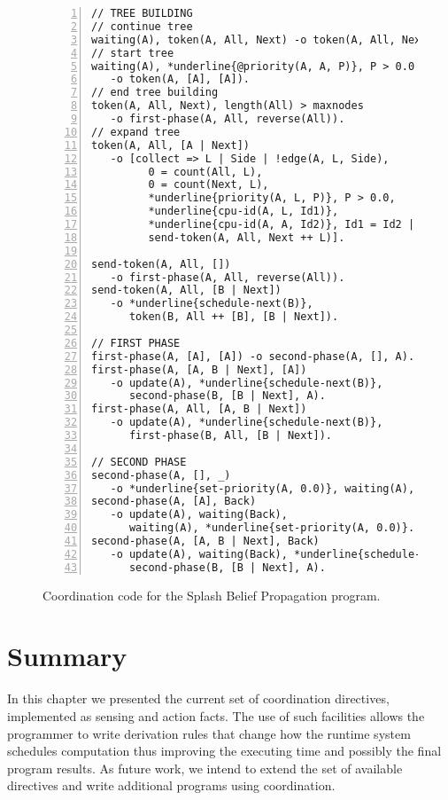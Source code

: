 \begin{figure}[h!]
\small\begin{Verbatim}[numbers=left,commandchars=*\{\}]
// TREE BUILDING
// continue tree
waiting(A), token(A, All, Next) -o token(A, All, Next).
// start tree
waiting(A), *underline{@priority(A, A, P)}, P > 0.0
   -o token(A, [A], [A]).
// end tree building
token(A, All, Next), length(All) > maxnodes
   -o first-phase(A, All, reverse(All)).
// expand tree
token(A, All, [A | Next])
   -o [collect => L | Side | !edge(A, L, Side),
         0 = count(All, L),
         0 = count(Next, L),
         *underline{priority(A, L, P)}, P > 0.0,
         *underline{cpu-id(A, L, Id1)},
         *underline{cpu-id(A, A, Id2)}, Id1 = Id2 |
         send-token(A, All, Next ++ L)].

send-token(A, All, [])
   -o first-phase(A, All, reverse(All)).
send-token(A, All, [B | Next])
   -o *underline{schedule-next(B)},
      token(B, All ++ [B], [B | Next]).

// FIRST PHASE
first-phase(A, [A], [A]) -o second-phase(A, [], A).
first-phase(A, [A, B | Next], [A])
   -o update(A), *underline{schedule-next(B)},
      second-phase(B, [B | Next], A).
first-phase(A, All, [A, B | Next])
   -o update(A), *underline{schedule-next(B)},
      first-phase(B, All, [B | Next]).

// SECOND PHASE
second-phase(A, [], _)
   -o *underline{set-priority(A, 0.0)}, waiting(A), update(A).
second-phase(A, [A], Back)
   -o update(A), waiting(Back),
      waiting(A), *underline{set-priority(A, 0.0)}.
second-phase(A, [A, B | Next], Back)
   -o update(A), waiting(Back), *underline{schedule-next(B)},
      second-phase(B, [B | Next], A).
\end{Verbatim}
  \caption{Coordination code for the Splash Belief Propagation program.}
  \label{code:sbp}
\end{figure}
\normalsize

\section{Summary}

In this chapter we presented the current set of coordination directives, implemented as sensing and action facts. The use of such facilities allows the programmer to write derivation rules that change how
the runtime system schedules computation thus improving the executing time and possibly the final program
results. As future work, we intend to extend the set of available directives and write additional programs using coordination.
